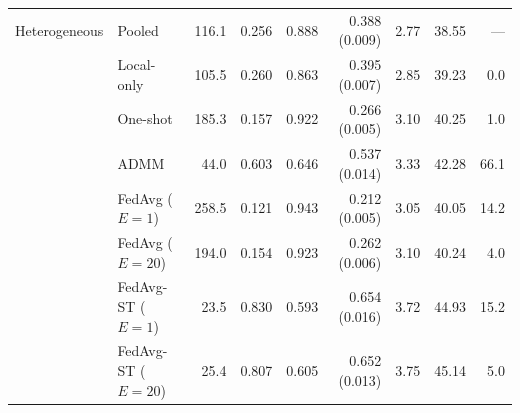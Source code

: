 \begin{table}[t]
\begin{tabular}{llrrrrrrr}
\midrule
Heterogeneous & Pooled & 116.1 & 0.256 & 0.888 & 0.388 (0.009) & 2.77 & 38.55 & --- \\
 & Local-only & 105.5 & 0.260 & 0.863 & 0.395 (0.007) & 2.85 & 39.23 & 0.0 \\
 & One-shot & 185.3 & 0.157 & 0.922 & 0.266 (0.005) & 3.10 & 40.25 & 1.0 \\
 & ADMM & 44.0 & 0.603 & 0.646 & 0.537 (0.014) & 3.33 & 42.28 & 66.1 \\
 & FedAvg ($E=1$) & 258.5 & 0.121 & 0.943 & 0.212 (0.005) & 3.05 & 40.05 & 14.2 \\
 & FedAvg ($E=20$) & 194.0 & 0.154 & 0.923 & 0.262 (0.006) & 3.10 & 40.24 & 4.0 \\
 & FedAvg-ST ($E=1$) & 23.5 & 0.830 & 0.593 & 0.654 (0.016) & 3.72 & 44.93 & 15.2 \\
 & FedAvg-ST ($E=20$) & 25.4 & 0.807 & 0.605 & 0.652 (0.013) & 3.75 & 45.14 & 5.0 \\

\bottomrule
\end{tabular}
\end{table}